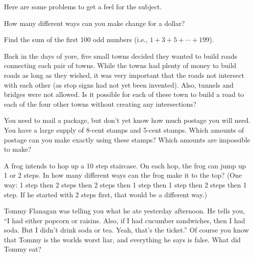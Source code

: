 \documentclass[11pt]{exam}
\begin{document}
Here are some problems to get a feel for the subject.
\begin{questions}


  \question How many different ways can you make change for a dollar?
  
  \question Find the sum of the first 100 odd numbers (i.e., $1 + 3 + 5 + \cdots + 199$).
  
  \question Back in the days of yore, five small towns decided they wanted to build roads connecting each pair of towns. While the towns had plenty of money to build roads as long as they wished, it was very important that the roads not intersect with each other (as stop signs had not yet been invented). Also, tunnels and bridges were not allowed. Is it possible for each of these town to build a road to each of the four other towns without creating any intersections? 
  
  \question You need to mail a package, but don't yet know how much postage you will need.  You have a large supply of 8-cent stamps and 5-cent stamps.  Which amounts of postage can you make exactly using these stamps?  Which amounts are impossible to make?
  
  \question A frog intends to hop up a 10 step staircase.  On each hop, the frog can jump up 1 or 2 steps.  In how many different ways can the frog make it to the top?  (One way: 1 step then 2 steps then 2 steps then 1 step then 1 step then 2 steps then 1 step. If he started with 2 steps first, that would be a different way.)
  
  \question Tommy Flanagan was telling you what he ate yesterday afternoon.  He tells you, ``I had either popcorn or raisins.  Also, if I had cucumber sandwiches, then I had soda.  But I didn't drink soda or tea.  Yeah, that's the ticket.''  Of course you know that Tommy is the worlds worst liar, and everything he says is false.  What did Tommy eat?


\end{questions}
\end{document}
